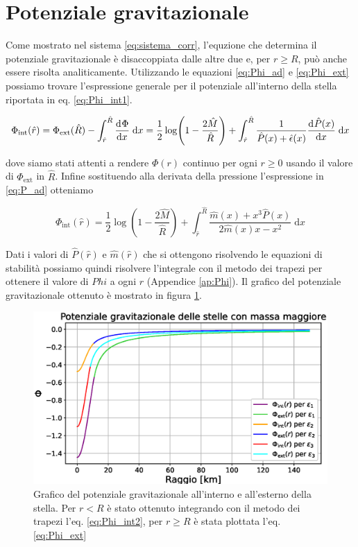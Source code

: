 \documentclass[a4paper, titlepage]{article}
\begin{document}
\section{Potenziale gravitazionale}

Come mostrato nel sistema \ref{eq:sistema_corr}, l'equzione che determina il
potenziale gravitazionale è disaccoppiata dalle altre due e, per $r \geq R$,
può anche essere risolta analiticamente.
Utilizzando le equazioni \ref{eq:Phi_ad} e \ref{eq:Phi_ext} possiamo trovare
l'espressione generale per il potenziale all'interno della stella riportata in
eq. \ref{eq:Phi_int1}.

\begin{equation}
    \Phi_\text{int} (\hat r) =
    \Phi_\text{ext} (\hat R) - \int_{\hat r}^{\hat R} \dv[]{\Phi}{x} \;\mathrm{d}x =
    \frac{1}{2} \log(1 - \frac{2 \hat M}{\hat R})
    + \int_{\hat r}^{\hat R} \frac{1}{\hat P (x) + \hat \epsilon (x)} \dv[]{\hat P (x)}{x} \;\mathrm{d}x
    \label{eq:Phi_int1}
\end{equation}

dove siamo stati attenti a rendere $\Phi (r)$ continuo per ogni $r \geq 0$
usando il valore di $\Phi_\text{ext}$ in $\hat R$. Infine sostituendo alla
derivata della pressione l'espressione in \ref{eq:P_ad} otteniamo

\begin{equation}
    \Phi_\text{int} (\hat r) =
    \frac{1}{2} \log(1 - \frac{2 \hat{M}}{\hat R}) + \int_{\hat r}^{\hat R}
    \frac{\hat m (x) + x^3 \hat P (x)}{2 \hat m (x) x - x^2}  \;\mathrm{d}x
    \label{eq:Phi_int2}
\end{equation}

Dati i valori di $\hat P (\hat r)$ e $\hat m (\hat r)$ che si ottengono
risolvendo le equazioni di stabilità possiamo quindi risolvere l'integrale con
il metodo dei trapezi per ottenere il valore di $Phi$ a ogni $r$ (Appendice
\ref{ap:Phi}).
Il grafico del potenziale gravitazionale ottenuto è mostrato in figura
\ref{fig:Phi}.

\begin{figure}[h!]
    \centering
    \includegraphics[width = 0.8 \textwidth]{Figures/Phi.eps}
    \caption{Grafico del potenziale gravitazionale all'interno e all'esterno
    della stella.
    Per $r < R$ è stato ottenuto integrando con il metodo dei trapezi l'eq.
    \ref{eq:Phi_int2}, per $r \geq R$ è stata plottata l'eq. \ref{eq:Phi_ext}}
    \label{fig:Phi}
\end{figure}
\end{document}
